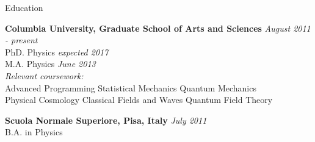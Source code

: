 \documentclass{resume} %
\begin{document}

\begin{rSection}{Education}

{\bf Columbia University, Graduate School of Arts and Sciences} \hfill {\em August 2011 - present} \\ 
PhD. Physics \hfill {\em expected 2017} \\ M.A. Physics \hfill {\em June 2013} 
\\
\textit{Relevant coursework:} \\
Advanced Programming \hspace{4pt} Statistical Mechanics \hspace{4pt} Quantum Mechanics\\
Physical Cosmology \hspace{4pt} Classical Fields and Waves \hspace{4pt} Quantum Field Theory

{\bf Scuola Normale Superiore, Pisa, Italy} \hfill {\em July 2011} \\ 
B.A. in Physics \\

\end{rSection}

\end{document}
